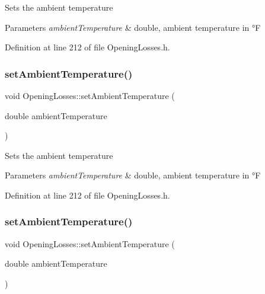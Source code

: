 Sets the ambient temperature 
\begin{DoxyParams}{Parameters}
{\em ambient\+Temperature} & double, ambient temperature in °F \\
\hline
\end{DoxyParams}


Definition at line 212 of file Opening\+Losses.\+h.

\mbox{\label{class_opening_losses_a3624c9fad2a413871b7324f7e957a5ae}} 
\subsubsection{\texorpdfstring{set\+Ambient\+Temperature()}{setAmbientTemperature()}\hspace{0.1cm}{\footnotesize\ttfamily [2/3]}}
{\footnotesize\ttfamily void Opening\+Losses\+::set\+Ambient\+Temperature (\begin{DoxyParamCaption}\item[{double}]{ambient\+Temperature }\end{DoxyParamCaption})\hspace{0.3cm}{\ttfamily [inline]}}

Sets the ambient temperature 
\begin{DoxyParams}{Parameters}
{\em ambient\+Temperature} & double, ambient temperature in °F \\
\hline
\end{DoxyParams}


Definition at line 212 of file Opening\+Losses.\+h.

\mbox{\label{class_opening_losses_a3624c9fad2a413871b7324f7e957a5ae}} 
\subsubsection{\texorpdfstring{set\+Ambient\+Temperature()}{setAmbientTemperature()}\hspace{0.1cm}{\footnotesize\ttfamily [3/3]}}
{\footnotesize\ttfamily void Opening\+Losses\+::set\+Ambient\+Temperature (\begin{DoxyParamCaption}\item[{double}]{ambient\+Temperature }\end{DoxyParamCaption})\hspace{0.3cm}{\ttfamily [inline]}}

